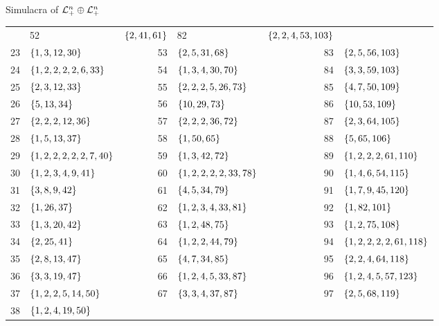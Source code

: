 \documentclass{interact}
\theoremstyle{plain}
\theoremstyle{definition}
\theoremstyle{remark}
\begin{document}
\begin{section}{Simulacra of ${\mathcal{L}^{{n}}_{+}}\oplus{ \mathcal{L}^{{n}}_{+} }$}
\begin{table}[H]
\begin{center}
\begin{tabular}{rl  rl  rl}
            & 52 & $\left\lbrace{2, 41, 61}\right\rbrace$
            & 82 & $\left\lbrace{2, 2, 4, 53, 103}\right\rbrace$\\
          23 & $\left\lbrace{1, 3, 12, 30}\right\rbrace$
            & 53 & $\left\lbrace{2, 5, 31, 68}\right\rbrace$
            & 83 & $\left\lbrace{2, 5, 56, 103}\right\rbrace$\\
          24 & $\left\lbrace{1, 2, 2, 2, 2, 6, 33}\right\rbrace$
            & 54 & $\left\lbrace{1, 3, 4, 30, 70}\right\rbrace$
            & 84 & $\left\lbrace{3, 3, 59, 103}\right\rbrace$\\
          25 & $\left\lbrace{2, 3, 12, 33}\right\rbrace$
            & 55 & $\left\lbrace{2, 2, 2, 5, 26, 73}\right\rbrace$
            & 85 & $\left\lbrace{4, 7, 50, 109}\right\rbrace$\\
          26 & $\left\lbrace{5, 13, 34}\right\rbrace$
            & 56 & $\left\lbrace{10, 29, 73}\right\rbrace$
            & 86 & $\left\lbrace{10, 53, 109}\right\rbrace$\\
          27 & $\left\lbrace{2, 2, 2, 12, 36}\right\rbrace$
            & 57 & $\left\lbrace{2, 2, 2, 36, 72}\right\rbrace$
            & 87 & $\left\lbrace{2, 3, 64, 105}\right\rbrace$\\
          28 & $\left\lbrace{1, 5, 13, 37}\right\rbrace$
            & 58 & $\left\lbrace{1, 50, 65}\right\rbrace$
            & 88 & $\left\lbrace{5, 65, 106}\right\rbrace$\\
          29 & $\left\lbrace{1, 2, 2, 2, 2, 2, 7, 40}\right\rbrace$
            & 59 & $\left\lbrace{1, 3, 42, 72}\right\rbrace$
            & 89 & $\left\lbrace{1, 2, 2, 2, 61, 110}\right\rbrace$\\
          30 & $\left\lbrace{1, 2, 3, 4, 9, 41}\right\rbrace$
            & 60 & $\left\lbrace{1, 2, 2, 2, 2, 33, 78}\right\rbrace$
            & 90 & $\left\lbrace{1, 4, 6, 54, 115}\right\rbrace$\\
          31 & $\left\lbrace{3, 8, 9, 42}\right\rbrace$
            & 61 & $\left\lbrace{4, 5, 34, 79}\right\rbrace$
            & 91 & $\left\lbrace{1, 7, 9, 45, 120}\right\rbrace$\\
          32 & $\left\lbrace{1, 26, 37}\right\rbrace$
            & 62 & $\left\lbrace{1, 2, 3, 4, 33, 81}\right\rbrace$
            & 92 & $\left\lbrace{1, 82, 101}\right\rbrace$\\
          33 & $\left\lbrace{1, 3, 20, 42}\right\rbrace$
            & 63 & $\left\lbrace{1, 2, 48, 75}\right\rbrace$
            & 93 & $\left\lbrace{1, 2, 75, 108}\right\rbrace$\\
          34 & $\left\lbrace{2, 25, 41}\right\rbrace$
            & 64 & $\left\lbrace{1, 2, 2, 44, 79}\right\rbrace$
            & 94 & $\left\lbrace{1, 2, 2, 2, 2, 61, 118}\right\rbrace$\\
          35 & $\left\lbrace{2, 8, 13, 47}\right\rbrace$
            & 65 & $\left\lbrace{4, 7, 34, 85}\right\rbrace$
            & 95 & $\left\lbrace{2, 2, 4, 64, 118}\right\rbrace$\\
          36 & $\left\lbrace{3, 3, 19, 47}\right\rbrace$
            & 66 & $\left\lbrace{1, 2, 4, 5, 33, 87}\right\rbrace$
            & 96 & $\left\lbrace{1, 2, 4, 5, 57, 123}\right\rbrace$\\
          37 & $\left\lbrace{1, 2, 2, 5, 14, 50}\right\rbrace$
            & 67 & $\left\lbrace{3, 3, 4, 37, 87}\right\rbrace$
            & 97 & $\left\lbrace{2, 5, 68, 119}\right\rbrace$\\
          38 & $\left\lbrace{1, 2, 4, 19, 50}\right\rbrace$

\end{tabular}
\end{center}
\end{table}
\end{section}
\end{document}
